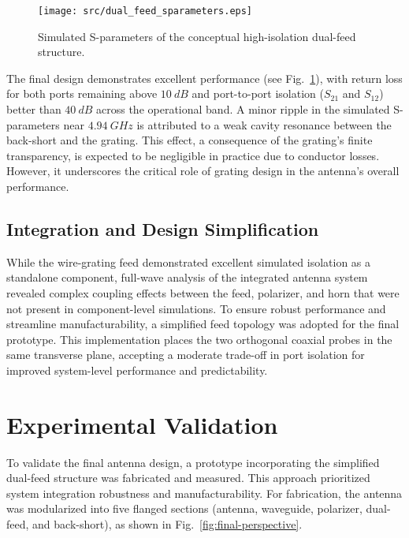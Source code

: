 \documentclass[journal]{IEEEtran}
\begin{document}
\begin{figure}[!b]
    \centering
    \texttt{[image: src/dual\_feed\_sparameters.eps]}
    \caption{\label{fig:dual-feed-sparameters}Simulated S-parameters of the conceptual high-isolation dual-feed structure.}
\end{figure}

The final design demonstrates excellent performance (see Fig.~\ref{fig:dual-feed-sparameters}), with return loss for both ports remaining above $\qty{10}{dB}$ and port-to-port isolation ($S_{21}$ and $S_{12}$) better than $\qty{40}{dB}$ across the operational band. A minor ripple in the simulated S-parameters near $\qty{4.94}{GHz}$ is attributed to a weak cavity resonance between the back-short and the grating. This effect, a consequence of the grating's finite transparency, is expected to be negligible in practice due to conductor losses. However, it underscores the critical role of grating design in the antenna's overall performance.

\subsection{Integration and Design Simplification}

While the wire-grating feed demonstrated excellent simulated isolation as a standalone component, full-wave analysis of the integrated antenna system revealed complex coupling effects between the feed, polarizer, and horn that were not present in component-level simulations. To ensure robust performance and streamline manufacturability, a simplified feed topology was adopted for the final prototype. This implementation places the two orthogonal coaxial probes in the same transverse plane, accepting a moderate trade-off in port isolation for improved system-level performance and predictability.


\section{Experimental Validation}
\label{sec:experimental-validation}

To validate the final antenna design, a prototype incorporating the simplified dual-feed structure was fabricated and measured. This approach prioritized system integration robustness and manufacturability. For fabrication, the antenna was modularized into five flanged sections (antenna, waveguide, polarizer, dual-feed, and back-short), as shown in Fig.~\ref{fig:final-perspective}.
\end{document}
